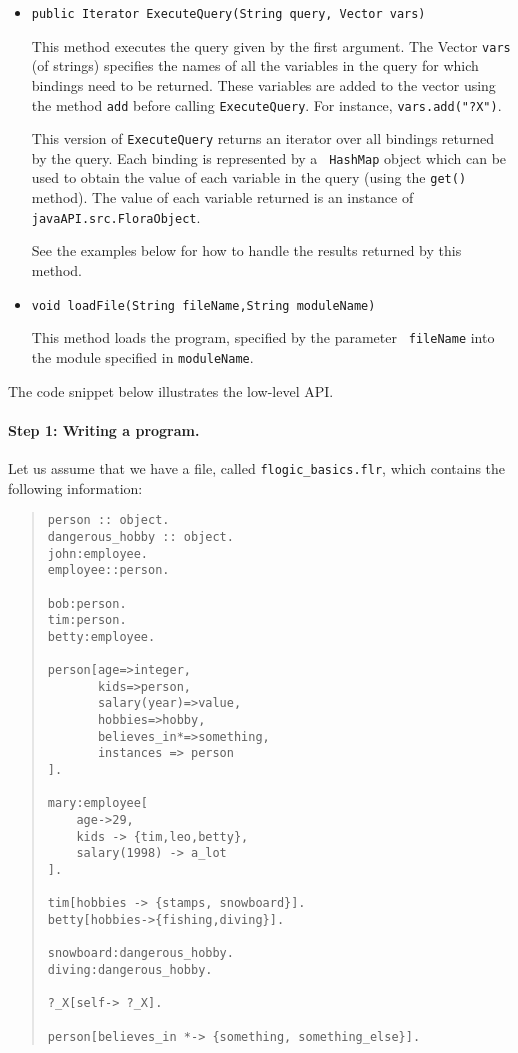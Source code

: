 \begin{itemize}
\item
\begin{verbatim}
public Iterator ExecuteQuery(String query, Vector vars)
\end{verbatim}
  This method executes the \FLORA query given by the first argument. The
  Vector {\tt vars} (of strings) specifies the names of all the variables
  in the query for which bindings need to be returned. These variables are
  added to the vector using the method {\tt add} before calling
  {\tt ExecuteQuery}. For instance, {\tt vars.add("?X")}.  
  
  This version of {\tt ExecuteQuery} returns an iterator over all bindings
  returned by the \FLORA query.  Each binding is represented by a {\tt
    HashMap} 
  object which can be used to obtain the value of each variable in the
  query (using the {\tt get()} method). The value of each variable returned
  is an instance of {\tt
    javaAPI.src.FloraObject}.

  See the examples below for how to handle the results
  returned by this method.

\item
\begin{verbatim}
void loadFile(String fileName,String moduleName)
\end{verbatim}
  This method loads the \FLORA program, specified by the parameter {\tt
    fileName} into the \FLORA module specified in {\tt moduleName}.
\end{itemize}

The code snippet below illustrates the low-level API.

\paragraph{Step 1: Writing a \FLORA program.}
  Let us assume that we have a file, called  {\tt flogic\_basics.flr},
  which contains the following information:
\begin{quote}
\begin{verbatim}
person :: object.
dangerous_hobby :: object.
john:employee.
employee::person.

bob:person.
tim:person.
betty:employee.

person[age=>integer,
       kids=>person,
       salary(year)=>value,
       hobbies=>hobby,
       believes_in*=>something,
       instances => person
].

mary:employee[
    age->29,
    kids -> {tim,leo,betty},
    salary(1998) -> a_lot
].

tim[hobbies -> {stamps, snowboard}].
betty[hobbies->{fishing,diving}].

snowboard:dangerous_hobby.
diving:dangerous_hobby.

?_X[self-> ?_X].

person[believes_in *-> {something, something_else}].
\end{verbatim}
\end{quote}

